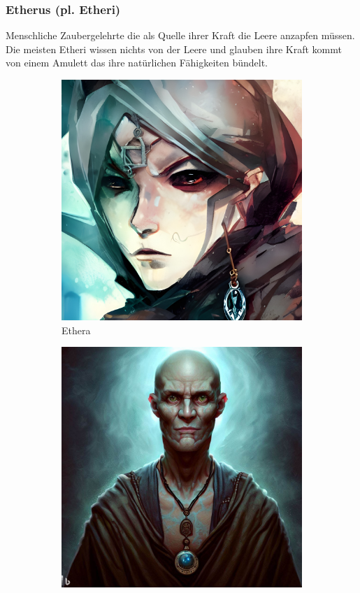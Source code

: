 \documentclass[11pt, twoside]{article}
\begin{document}
\subsubsection{Etherus (pl. Etheri)\label{etheri}}
\label{sec:org5c98237}
Menschliche Zaubergelehrte die als Quelle ihrer Kraft die Leere anzapfen müssen. Die meisten Etheri wissen nichts von der Leere und glauben ihre Kraft kommt von einem Amulett das ihre natürlichen Fähigkeiten bündelt.
\begin{figure}[H]
\centering
\caption{Etheri}
\label{fig:etheri}
  \begin{subfigure}{0.3\textwidth}
    \centering
    \includegraphics[width=0.99\linewidth]{etheri1.jpeg}
    \caption{Ethera}
  \end{subfigure}%
  \begin{subfigure}{0.3\textwidth}
    \centering
    \includegraphics[width=0.99\linewidth]{etheri2.jpeg}

\end{subfigure}
\end{figure}
\end{document}
